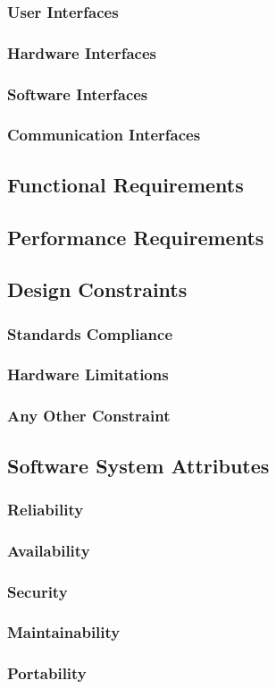 \documentclass[a4paper]{article}
\begin{document}
\subsubsection{User Interfaces}
\subsubsection{Hardware Interfaces}
\subsubsection{Software Interfaces}
\subsubsection{Communication Interfaces}
\subsection{Functional Requirements}
\subsection{Performance Requirements}
\subsection{Design Constraints}
\subsubsection{Standards Compliance}
\subsubsection{Hardware Limitations}
\subsubsection{Any Other Constraint}
\subsection{Software System Attributes}
\subsubsection{Reliability}
\subsubsection{Availability}
\subsubsection{Security}
\subsubsection{Maintainability}
\subsubsection{Portability}
\end{document}
